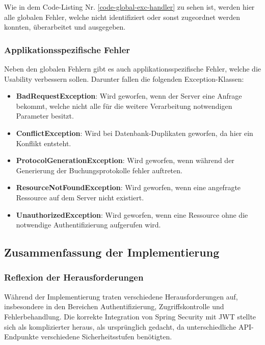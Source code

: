 				Wie in dem Code-Listing Nr. \ref{code-global-exc-handler} zu sehen ist, werden hier alle globalen Fehler, welche nicht identifiziert oder sonst zugeordnet werden konnten, überarbeitet und ausgegeben. 
				
				\subsubsection{Applikationsspezifische Fehler}
				
				Neben den globalen Fehlern gibt es auch applikationsspezifische Fehler, welche die Usability verbessern sollen. 
				Darunter fallen die folgenden Exception-Klassen:
				
				\begin{itemize}
					\item \textbf{BadRequestException}: Wird geworfen, wenn der Server eine Anfrage bekommt, welche nicht alle für die weitere Verarbeitung notwendigen Parameter besitzt.
					\item \textbf{ConflictException}: Wird bei Datenbank-Duplikaten geworfen, da hier ein Konflikt entsteht.
					\item \textbf{ProtocolGenerationException}: Wird geworfen, wenn während der Generierung der Buchungsprotokolle fehler auftreten.
					\item \textbf{ResourceNotFoundException}: Wird geworfen, wenn eine angefragte Ressource auf dem Server nicht existiert.
					\item \textbf{UnauthorizedException}: Wird geworfen, wenn eine Ressource ohne die notwendige Authentifizierung aufgerufen wird.
				\end{itemize}
				
				\subsection{Zusammenfassung der Implementierung}
				
				\subsubsection{Reflexion der Herausforderungen}
				
				Während der Implementierung traten verschiedene Herausforderungen auf, insbesondere in den Bereichen Authentifizierung, Zugriffskontrolle und Fehlerbehandlung. Die korrekte Integration von Spring Security mit JWT stellte sich als komplizierter heraus, als ursprünglich gedacht, da unterschiedliche API-Endpunkte verschiedene Sicherheitsstufen benötigten.
				
